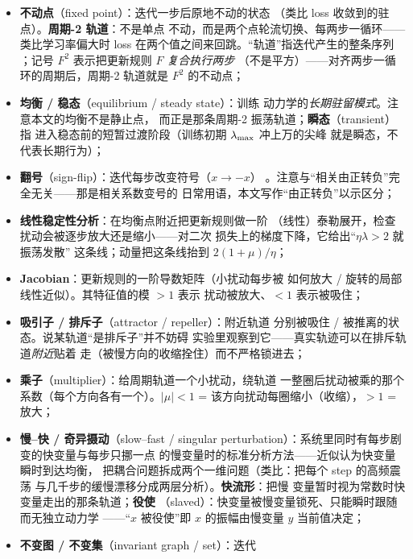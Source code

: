 \begin{itemize}
  \item \textbf{不动点}（fixed point）：迭代一步后原地不动的状态
        （类比 loss 收敛到的驻点）。\textbf{周期-2 轨道}：不是单点
        不动，而是两个点轮流切换、每两步一循环——类比学习率偏大时
        loss 在两个值之间来回跳。``轨道''指迭代产生的整条序列
        ；记号 $F^{2}$ 表示把更新规则 $F$ \emph{复合执行两步}
        （不是平方）——对齐两步一循环的周期后，周期-2 轨道就是
        $F^{2}$ 的不动点；
  \item \textbf{均衡 / 稳态}（equilibrium / steady state）：训练
        动力学的\emph{长期驻留模式}。注意本文的均衡不是静止点，
        而正是那条周期-2 振荡轨道；\textbf{瞬态}（transient）指
        进入稳态前的短暂过渡阶段（训练初期 $\lambda_{\max}$ 冲上万的尖峰
        就是瞬态，不代表长期行为）；
  \item \textbf{翻号}（sign-flip）：迭代每步改变符号（$x\to-x$）
        。注意与``相关由正转负''完全无关——那是相关系数变号的
        日常用语，本文写作``由正转负''以示区分；
  \item \textbf{线性稳定性分析}：在均衡点附近把更新规则做一阶
        （线性）泰勒展开，检查扰动会被逐步放大还是缩小——对二次
        损失上的梯度下降，它给出``$\eta\lambda>2$ 就振荡发散''
        这条线；动量把这条线抬到 $2(1{+}\mu)/\eta$；
  \item \textbf{Jacobian}：更新规则的一阶导数矩阵（小扰动每步被
        如何放大 / 旋转的局部线性近似）。其特征值的模 $>1$ 表示
        扰动被放大、$<1$ 表示被吸住；
  \item \textbf{吸引子 / 排斥子}（attractor / repeller）：附近轨道
        分别被吸住 / 被推离的状态。说某轨道``是排斥子''并不妨碍
        实验里观察到它——真实轨迹可以在排斥轨道\emph{附近}贴着
        走（被慢方向的收缩拴住）而不严格锁进去；
  \item \textbf{乘子}（multiplier）：给周期轨道一个小扰动，绕轨道
        一整圈后扰动被乘的那个系数（每个方向各有一个）。$|\mu|<1$
        = 该方向扰动每圈缩小（收缩），$>1$ = 放大；
  \item \textbf{慢--快 / 奇异摄动}（slow--fast / singular
        perturbation）：系统里同时有每步剧变的快变量与每步只挪一点
        的慢变量时的标准分析方法——近似认为快变量瞬时到达均衡，
        把耦合问题拆成两个一维问题（类比：把每个 step 的高频震荡
        与几千步的缓慢漂移分成两层分析）。\textbf{快流形}：把慢
        变量暂时视为常数时快变量走出的那条轨道；\textbf{役使}
        （slaved）：快变量被慢变量锁死、只能瞬时跟随而无独立动力学
        ——``$x$ 被役使''即 $x$ 的振幅由慢变量 $y$ 当前值决定；
  \item \textbf{不变图 / 不变集}（invariant graph / set）：迭代

\end{itemize}
